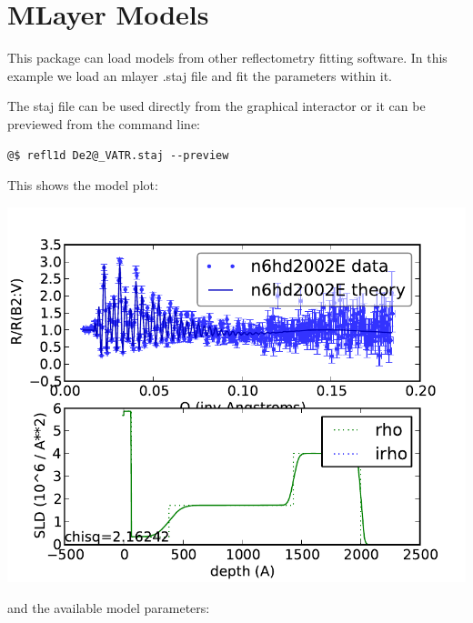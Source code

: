 \documentclass[letterpaper,10pt,english]{sphinxmanual}
\begin{document}
\section{MLayer Models}
\label{examples/staj/readme:mlayer-models}\label{examples/staj/readme::doc}
This package can load models from other reflectometry fitting software.  In
this example we load an mlayer .staj file and fit the parameters within it.

The staj file can be used directly from the graphical interactor or it can
be previewed from the command line:

\begin{Verbatim}[commandchars=@\[\]]
@$ refl1d De2@_VATR.staj --preview
\end{Verbatim}

This shows the model plot:

\includegraphics{aee62ada96.pdf}

and the available model parameters:
\end{document}
